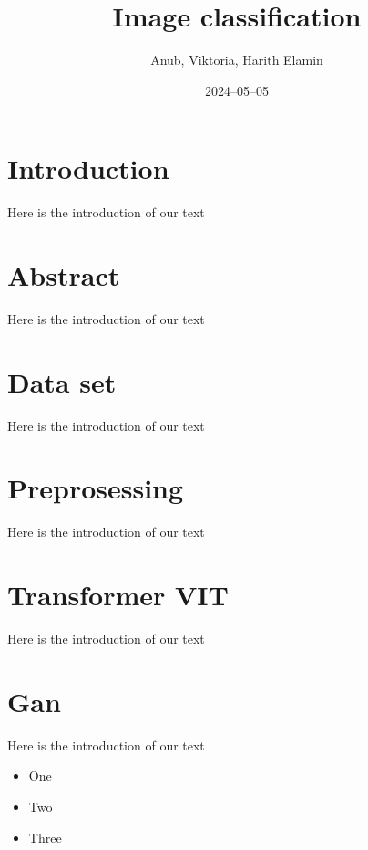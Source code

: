 \documentclass[12pt]{article}
\title{Image classification}
\author{Anub, Viktoria, Harith Elamin}
\date{2024–05–05}
\begin{document}
\maketitle

\section{Introduction}

Here is the introduction of our text

\section{Abstract}

Here is the introduction of our text

\section{Data set}

Here is the introduction of our text

\section{Preprosessing}

Here is the introduction of our text

\section{Transformer VIT}

Here is the introduction of our text

\section{Gan}

Here is the introduction of our text

\begin{itemize}

\item One

\item Two

\item Three

\end{itemize}
\end{document}

